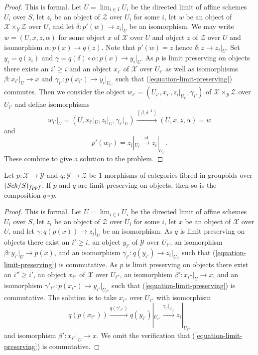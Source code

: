 \begin{proof}
This is formal. Let $U = \lim_{i \in I} U_i$ be the directed limit
of affine schemes $U_i$ over $S$, let $z_i$ be an object of $\mathcal{Z}$
over $U_i$ for some $i$, let $w$ be an object of
$\mathcal{X} \times_\mathcal{Y} \mathcal{Z}$ over $U$, and let
$\delta : p'(w) \to z_i|_U$ be an isomorphism.
We may write
$w = (U, x, z, \alpha)$ for some object $x$ of $\mathcal{X}$ over $U$
and object $z$ of $\mathcal{Z}$ over $U$ and isomorphism
$\alpha : p(x) \to q(z)$. Note that $p'(w) = z$ hence
$\delta : z \to z_i|_U$. Set $y_i = q(z_i)$ and
$\gamma = q(\delta) \circ \alpha : p(x) \to y_i|_U$.
As $p$ is limit preserving on objects there exists an $i' \geq i$
and an object $x_{i'}$ of $\mathcal{X}$ over $U_{i'}$ as well as
isomorphisms $\beta : x_{i'}|_U \to x$ and
$\gamma_{i'} : p(x_{i'}) \to y_i|_{U_{i'}}$ such that
(\ref{equation-limit-preserving}) commutes. Then we consider the object
$w_{i'} = (U_{i'}, x_{i'}, z_i|_{U_{i'}}, \gamma_{i'})$ of
$\mathcal{X} \times_\mathcal{Y} \mathcal{Z}$ over $U_{i'}$
and define isomorphisms
$$
w_{i'}|_U = (U, x_{i'}|_U, z_i|_U, \gamma_{i'}|_U)
\xrightarrow{(\beta, \delta^{-1})}
(U, x, z, \alpha) = w
$$
and
$$
p'(w_{i'}) = z_i|_{U_{i'}} \xrightarrow{\text{id}} z_i|_{U_{i'}}.
$$
These combine to give a solution to the problem.
\end{proof}

\begin{lemma}
\label{lemma-composition-limit-preserving}
Let $p : \mathcal{X} \to \mathcal{Y}$ and $q : \mathcal{Y} \to \mathcal{Z}$
be $1$-morphisms of categories fibred in groupoids over $(\mathit{Sch}/S)_{fppf}$.
If $p$ and $q$ are limit preserving on objects, then so is the composition
$q \circ p$.
\end{lemma}

\begin{proof}
This is formal. Let $U = \lim_{i \in I} U_i$ be the directed limit
of affine schemes $U_i$ over $S$, let $z_i$ be an object of $\mathcal{Z}$
over $U_i$ for some $i$, let $x$ be an object of $\mathcal{X}$ over $U$,
and let $\gamma : q(p(x)) \to z_i|_U$ be an isomorphism. As $q$ is
limit preserving on objects there exist an $i' \geq i$, an object
$y_{i'}$ of $\mathcal{Y}$ over $U_{i'}$, an isomorphism
$\beta : y_{i'}|_U \to p(x)$, and an isomorphism
$\gamma_{i'} : q(y_{i'}) \to z_i|_{U_{i'}}$
such that (\ref{equation-limit-preserving}) is commutative. As $p$ is
limit preserving on objects there exist an $i'' \geq i'$, an object
$x_{i''}$ of $\mathcal{X}$ over $U_{i''}$, an isomorphism
$\beta' : x_{i''}|_U \to x$, and an isomorphism
$\gamma'_{i''} : p(x_{i''}) \to y_{i'}|_{U_{i''}}$
such that (\ref{equation-limit-preserving}) is commutative.
The solution is to take $x_{i''}$ over $U_{i''}$ with isomorphism
$$
q(p(x_{i''})) \xrightarrow{q(\gamma'_{i''})}
q(y_{i'})|_{U_{i''}} \xrightarrow{\gamma_{i'}|_{U_{i''}}}
z_i|_{U_{i''}}
$$
and isomorphism $\beta' : x_{i''}|_U \to x$. We omit the verification
that (\ref{equation-limit-preserving}) is commutative.
\end{proof}

